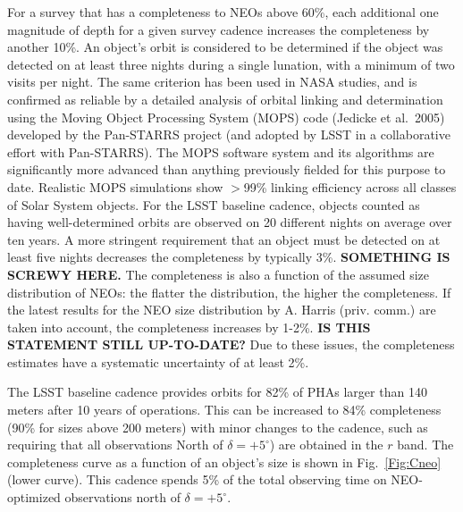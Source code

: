 \documentclass{emulateapj}
\begin{document}
For a survey that has a completeness to NEOs above 60\%, each
additional one magnitude of depth for a given survey cadence increases
the completeness by another 10\%.  An object's orbit is considered to be 
determined if the object was detected on at least three nights during a single 
lunation, with a minimum of two visits per night. The same criterion
has been used in NASA studies,
and is confirmed as 
reliable by a detailed analysis of orbital linking and determination using
the Moving Object Processing System (MOPS) code (Jedicke et al.~2005) developed by the Pan-STARRS project (and 
adopted by LSST in a collaborative effort with Pan-STARRS). The MOPS software
system and its algorithms are significantly more advanced than
anything previously 
fielded for this purpose to date. Realistic MOPS simulations show 
$>$99\% linking efficiency across all classes of Solar System objects. 
For the LSST baseline cadence, objects
counted as having well-determined orbits are observed on 20 different nights on average over ten
years. A more stringent requirement that an object must be detected on at least 
five nights decreases the completeness by typically 3\%. {\bf
  SOMETHING IS SCREWY HERE.}  The completeness is also a
function of the assumed size distribution of NEOs: the flatter the distribution, the 
higher the completeness. If the latest results for the NEO size
distribution by A. Harris (priv. comm.) are taken into account, the
completeness increases by 1-2\%. {\bf IS THIS STATEMENT STILL
  UP-TO-DATE?} Due to these issues, the completeness
estimates have a systematic uncertainty of at least 2\%. 

The LSST baseline cadence provides orbits for 82\% of PHAs larger than 140
meters after 10 years of operations.  This can be increased to 84\%
completeness (90\% for sizes above 200 meters) with minor changes to
the cadence, such as 
requiring that all observations North of $\delta =+5^\circ$) are
obtained in the $r$ band.  The completeness curve as a function of an object's size is shown 
in Fig.~\ref{Fig:Cneo} (lower curve). This cadence spends 5\% of the total 
observing time on NEO-optimized observations north of $\delta = +5^\circ$.
\end{document}
